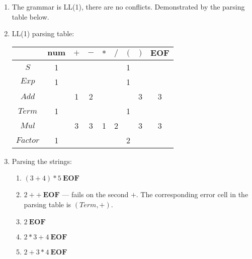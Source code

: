 \begin{exercise}{}
\begin{solution}
\begin{enumerate}
\begin{enumerate}
        \end{enumerate}
      \item The grammar is LL(1), there are no conflicts. Demonstrated by the
      parsing table below.
      \item LL(1) parsing table:
        \begin{center}
          \begin{tabular}{c|c|c|c|c|c|c|c|c}
            & \(\mathbf{num}\) & \(+\) & \(-\) & \(*\) & \(/\) & \((\) & \()\) & \(\mathbf{EOF}\) \\
            \hline
            \(S\) & 1 & & & & & 1 & &\\
            \(Exp\) & 1 & & & & & 1 & &\\
            \(Add\) & & 1 & 2 & & & & 3 & 3 \\
            \(Term\) & 1 & & & & & 1 & & \\
            \(Mul\) & & 3 & 3 & 1 & 2 & & 3 & 3 \\
            \(Factor\) & 1 & & & & & 2 & & \\
          \end{tabular}
        \end{center}
      \item Parsing the strings:
      \begin{enumerate}
        \item \((3 + 4) * 5 ~\mathbf{EOF}\) \checkmark
        \item \(2 + + ~\mathbf{EOF}\) --- fails on the second \(+\). The
        corresponding error cell in the parsing table is \((Term, +)\).
        \item \(2 ~\mathbf{EOF}\) \checkmark
        \item \(2 * 3 + 4 ~\mathbf{EOF}\) \checkmark
        \item \(2 + 3 * 4 ~\mathbf{EOF}\) \checkmark
      \end{enumerate}


\end{enumerate}
\end{solution}
\end{exercise}
